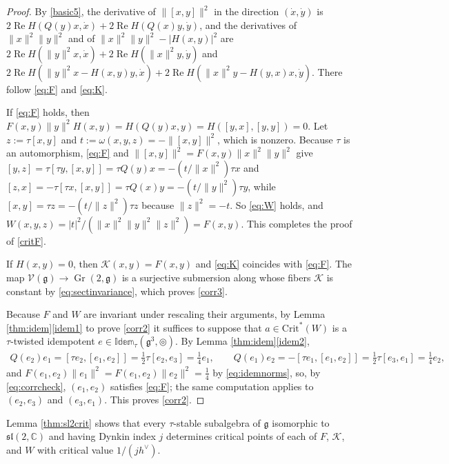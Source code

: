 \documentclass [leqno, 10pt]{amsart}
\theoremstyle{definition}
\numberwithin{equation}{section}
\newcommand{\grass}{\operatorname{Gr}}
\newcommand{\sect}{\mathscr{K}}
\newcommand{\idem}{\mathbb{Idem}}
\newcommand{\tmlt}{\circledcirc}
\newcommand{\om}{\omega}
\newcommand{\re}{\operatorname{Re}}
\newcommand{\sll}{\mathfrak{sl}}
\newcommand{\g}{\mathfrak{g}}
\newcommand{\stiefel}{\mathscr{V}}
\newcommand{\com}{\mathbb C}
\newcommand{\crtnt}{\mathrm{Crit}^*}
\newcommand{\hv}{h^\vee}
\newcommand{\norm}[1]{\lVert #1\rVert}
\newcommand{\qad}{Q}
\begin{document}
\begin{proof}
By \eqref{basic5}, the derivative of $\norm{[x, y]}^{2}$ in the direction $(\dot{x}, \dot{y})$ is $2\re H(\qad(y)x, \dot{x}) + 2\re H(\qad(x)y, \dot{y})$, and the derivatives of $\norm{x}^{2}\norm{y}^{2}$ and of $\norm{x}^{2}\norm{y}^{2} - |H(x, y)|^{2}$ are $2\re H(\norm{y}^{2}x, \dot{x}) + 2\re H(\norm{x}^{2}y, \dot{y})$ and $2\re H(\norm{y}^{2}x - H(x, y)y, \dot{x}) + 2\re H(\norm{x}^{2}y - H(y, x)x, \dot{y})$. There follow \eqref{eq:F} and \eqref{eq:K}. 

If \eqref{eq:F} holds, then $F(x, y)\norm{y}^{2}H(x, y) = H(\qad(y)x, y) = H([y, x], [y, y]) = 0$. Let $z := \tau[x, y]$ and $t := \om(x, y, z) = -\norm{[x, y]}^{2}$, which is nonzero. Because $\tau$ is an automorphism, \eqref{eq:F} and $\norm{[x, y]}^{2} = F(x, y)\norm{x}^{2}\norm{y}^{2}$ give $[y, z] = \tau[\tau y, [x, y]] = \tau\qad(y)x = -(t/\norm{x}^{2})\tau x$ and $[z, x] = -\tau[\tau x, [x, y]] = \tau\qad(x)y = -(t/\norm{y}^{2})\tau y$, while $[x, y] = \tau z = -(t/\norm{z}^{2})\tau z$ because $\norm{z}^{2} = -t$. So \eqref{eq:W} holds, and $W(x, y, z) = |t|^{2}/(\norm{x}^{2}\norm{y}^{2}\norm{z}^{2}) = F(x, y)$. This completes the proof of \ref{critF}.

If $H(x, y) = 0$, then $\sect(x, y) = F(x, y)$ and \eqref{eq:K} coincides with \eqref{eq:F}. The map $\stiefel(\g) \to \grass(2, \g)$ is a surjective submersion along whose fibers $\sect$ is constant by \eqref{eq:sectinvariance}, which proves \ref{corr3}.

Because $F$ and $W$ are invariant under rescaling their arguments, by Lemma \ref{thm:idem}\ref{idem1} to prove \ref{corr2} it suffices to suppose that $a \in \crtnt(W)$ is a $\tau$-twisted idempotent $e \in \idem_{\tau}(\g^{3}, \tmlt)$. By Lemma \ref{thm:idem}\ref{idem2}, 
\begin{align}\label{eq:corrcheck}
\qad(e_{2})e_{1} = [\tau e_{2}, [e_{1}, e_{2}]] = \tfrac{1}{2}\tau[e_{2}, e_{3}] = \tfrac{1}{4}e_{1}, \qquad \qad(e_{1})e_{2} = -[\tau e_{1}, [e_{1}, e_{2}]] = \tfrac{1}{2}\tau[e_{3}, e_{1}] = \tfrac{1}{4}e_{2},
\end{align}
and $F(e_{1}, e_{2})\norm{e_{1}}^{2} = F(e_{1}, e_{2})\norm{e_{2}}^{2} = \tfrac{1}{4}$ by \eqref{eq:idemnorms}, so, by \eqref{eq:corrcheck}, $(e_{1}, e_{2})$ satisfies \eqref{eq:F}; the same computation applies to $(e_{2}, e_{3})$ and $(e_{3}, e_{1})$. This proves \ref{corr2}.
\end{proof}

Lemma \ref{thm:sl2crit} shows that every $\tau$-stable subalgebra of $\g$ isomorphic to $\sll(2, \com)$ and having Dynkin index $j$ determines critical points of each of $F$, $\sect$, and $W$ with critical value $1/(j\hv)$. 
\end{document}
